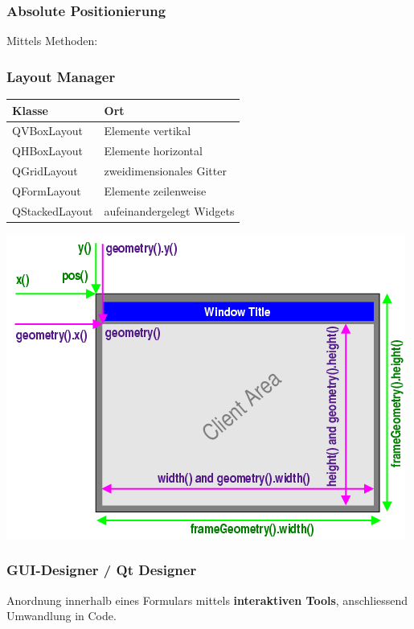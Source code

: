 \subsubsection{Absolute Positionierung}
Mittels Methoden:
\begin{multicols}{2}
    \begin{minipage}{1.08\linewidth}
        
        \subsubsection{Layout Manager} %
        \begin{tabular}{|l|l|}
            \hline \textbf{Klasse} & \textbf{Ort}\\
            \hline QVBoxLayout & Elemente vertikal\\
            \hline QHBoxLayout & Elemente horizontal\\
            \hline QGridLayout & zweidimensionales Gitter\\
            \hline QFormLayout & Elemente zeilenweise\\
            \hline QStackedLayout & aufeinandergelegt Widgets\\
            \hline
        \end{tabular}
       \end{minipage}	
		
	\includegraphics[width=0.8\linewidth]{images/geometry.png}
\end{multicols}


	
\subsubsection{GUI-Designer / Qt Designer}	
	Anordnung innerhalb eines Formulars mittels\textbf{ interaktiven Tools}, anschliessend Umwandlung in Code. 	

